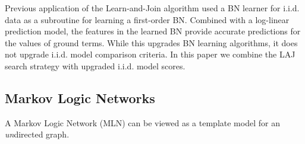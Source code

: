 \documentclass[letterpaper]{article}
\begin{document}

% 
%

Previous application of the Learn-and-Join algorithm \cite{Schulte2012} used a BN learner for i.i.d. data as a subroutine for learning a first-order BN. Combined with a log-linear prediction model, the features in the learned BN provide accurate predictions for the values of ground terms. While this upgrades BN learning algorithms, it does not upgrade i.i.d. model comparison criteria. In this paper we combine the LAJ search strategy with upgraded i.i.d. model scores.

\subsection{Markov Logic Networks}
A Markov Logic Network (MLN)  can be viewed as a template model for an {\em  un}directed graph.
\end{document}

